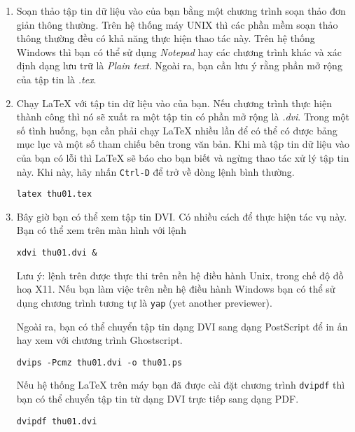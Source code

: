 \begin{enumerate}
\item
  Soạn thảo tập tin dữ liệu vào của bạn bằng một chương trình soạn
  thảo đơn giản thông thường. Trên hệ thống máy UNIX thì các phần
  mềm soạn thảo thông thường đều có khả năng thực hiện thao tác
  này. Trên hệ thống Windows thì bạn có thể sử dụng \emph{Notepad}
  hay các chương trình khác và xác định dạng lưu trữ là
  \emph{Plain text}. Ngoài ra, bạn cần lưu ý rằng phần mở rộng của tập
  tin là \emph{.tex}.

\item
  Chạy \LaTeX{} với tập tin dữ liệu vào của bạn. Nếu chương trình thực hiện thành công thì nó sẽ xuất ra một tập tin có phần mở rộng là \emph{.dvi}. Trong một số tình huống, bạn cần phải chạy \LaTeX{} nhiều lần để có thể có được bảng mục lục và một số tham chiếu bên trong văn bản. Khi mà tập tin dữ liệu vào của bạn có lỗi thì \LaTeX{} sẽ báo cho bạn biết và ngừng thao tác xử lý tập tin này. Khi này, hãy nhấn \texttt{Ctrl-D} để trở về dòng lệnh bình thường.

\begin{lscommand}
\verb+latex thu01.tex+
\end{lscommand}

\item Bây giờ bạn có thể xem tập tin DVI. Có nhiều cách để thực hiện tác vụ này. Bạn có thể xem trên màn hình với lệnh
\begin{lscommand}
\verb+xdvi thu01.dvi &+
\end{lscommand}

Lưu ý: lệnh trên được thực thi trên nền hệ điều hành Unix, trong chế độ đồ hoạ X11. Nếu bạn làm việc trên nền hệ điều hành Windows bạn có thể sử dụng chương trình tương tự là \texttt{yap} (yet another previewer).

Ngoài ra, bạn có thể chuyển tập tin dạng DVI sang dạng PostScript để in ấn hay xem với chương trình Ghostscript.

\begin{lscommand}
\verb+dvips -Pcmz thu01.dvi -o thu01.ps+
\end{lscommand}

Nếu hệ thống \LaTeX{} trên máy bạn đã được cài đặt chương trình \texttt{dvipdf} thì bạn có thể chuyển tập tin từ dạng DVI trực tiếp sang dạng PDF.

\begin{lscommand}
\verb+dvipdf thu01.dvi+
\end{lscommand}

\end{enumerate}


